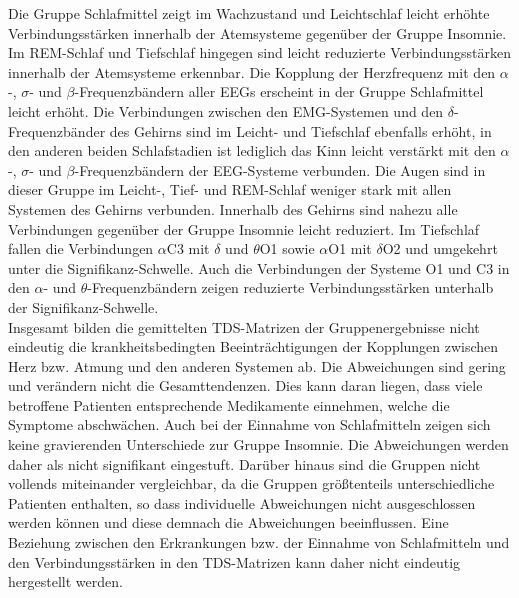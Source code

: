 Die Gruppe Schlafmittel zeigt im Wachzustand und Leichtschlaf leicht erhöhte Verbindungsstärken innerhalb der Atemsysteme gegenüber der Gruppe Insomnie. Im \acs{REM}-Schlaf und Tiefschlaf hingegen sind leicht reduzierte Verbindungsstärken innerhalb der Atemsysteme erkennbar. Die Kopplung der Herzfrequenz mit den $\alpha$-, $\sigma$- und $\beta$-Frequenzbändern aller \acs{EEG}s erscheint in der Gruppe Schlafmittel leicht erhöht. Die Verbindungen zwischen den \acs{EMG}-Systemen und den $\delta$-Frequenzbänder des Gehirns sind im Leicht- und Tiefschlaf ebenfalls erhöht, in den anderen beiden Schlafstadien ist lediglich das Kinn leicht verstärkt mit den $\alpha$-, $\sigma$- und $\beta$-Frequenzbändern der \acs{EEG}-Systeme verbunden. Die Augen sind in dieser Gruppe im Leicht-, Tief- und \acs{REM}-Schlaf weniger stark mit allen Systemen des Gehirns verbunden. Innerhalb des Gehirns sind nahezu alle Verbindungen gegenüber der Gruppe Insomnie leicht reduziert. Im Tiefschlaf fallen die Verbindungen $\alpha$C3 mit $\delta$ und $\theta$O1 sowie $\alpha$O1 mit $\delta$O2 und umgekehrt unter die Signifikanz-Schwelle. Auch die Verbindungen der Systeme O1 und C3 in den $\alpha$- und $\theta$-Frequenzbändern zeigen reduzierte Verbindungsstärken unterhalb der Signifikanz-Schwelle.\\

Insgesamt bilden die gemittelten \acs{TDS}-Matrizen der Gruppenergebnisse nicht eindeutig die krankheitsbedingten Beeinträchtigungen der Kopplungen zwischen Herz bzw. Atmung und den anderen Systemen ab. Die Abweichungen sind gering und verändern nicht die Gesamttendenzen. Dies kann daran liegen, dass viele betroffene Patienten entsprechende Medikamente einnehmen, welche die Symptome abschwächen. Auch bei der Einnahme von Schlafmitteln zeigen sich keine gravierenden Unterschiede zur Gruppe Insomnie. Die Abweichungen werden daher als nicht signifikant eingestuft. Darüber hinaus sind die Gruppen nicht vollends miteinander vergleichbar, da die Gruppen größtenteils unterschiedliche Patienten enthalten, so dass individuelle Abweichungen nicht ausgeschlossen werden können und diese demnach die Abweichungen beeinflussen. Eine Beziehung zwischen den Erkrankungen bzw. der Einnahme von Schlafmitteln und den Verbindungsstärken in den \acs{TDS}-Matrizen kann daher nicht eindeutig hergestellt werden. \\

